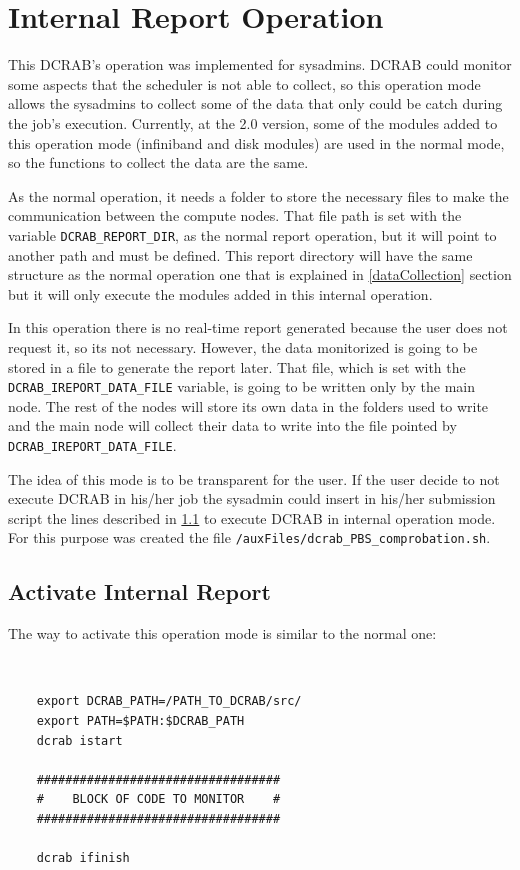 \documentclass[10pt,a4paper]{report}
\begin{document}
\chapter{Internal Report Operation}
\label{internalReportChapter}
This DCRAB's operation was implemented for sysadmins. DCRAB could monitor some aspects that the scheduler is not able to collect, so this operation mode allows the sysadmins to collect some of the data that only could be catch during the job's execution. Currently, at the 2.0 version, some of the modules added to this operation mode (infiniband and disk modules) are used in the normal mode, so the functions to collect the data are the same.

As the normal operation, it needs a folder to store the necessary files to make the communication between the compute nodes. That file path is set with the variable \verb+DCRAB_REPORT_DIR+, as the normal report operation, but it will point to another path and must be defined. This report directory will have the same structure as the normal operation one that is explained in \ref{dataCollection} section but it will only execute the modules added in this internal operation.

In this operation there is no real-time report generated because the user does not request it, so its not necessary. However, the data monitorized is going to be stored in a file to generate the report later. That file, which is set with the \verb+DCRAB_IREPORT_DATA_FILE+ variable, is going to be written only by the main node. The rest of the nodes will store its own data in the folders used to write and the main node will collect their data to write into the file pointed by \verb+DCRAB_IREPORT_DATA_FILE+.

The idea of this mode is to be transparent for the user. If the user decide to not execute DCRAB in his/her job the sysadmin could insert in his/her submission script the lines described in \ref{internalReport} to execute DCRAB in internal operation mode. For this purpose was created the file \texttt{/auxFiles/dcrab\_PBS\_comprobation.sh}.

\section{Activate Internal Report}
\label{internalReport}
The way to activate this operation mode is similar to the normal one:

\ \

\begin{verbatim}
    export DCRAB_PATH=/PATH_TO_DCRAB/src/
    export PATH=$PATH:$DCRAB_PATH
    dcrab istart

    ##################################
    #    BLOCK OF CODE TO MONITOR    #
    ##################################

    dcrab ifinish
\end{verbatim}
\end{document}
